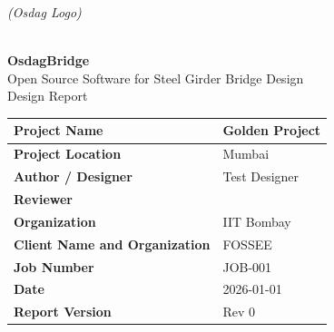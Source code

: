 
\begin{titlepage}
\thispagestyle{firstpage}
\centering
\vspace*{1.5cm}
\noindent
\begin{minipage}[c]{0.6\textwidth}
\raggedright
\textit{(Osdag Logo)}
\end{minipage}%
\hfill
\begin{minipage}[c]{0.35\textwidth}
\raggedleft

\end{minipage}
\\[1cm]

{\Huge \textbf{OsdagBridge}}\\[0.3cm]
{\large Open Source Software for Steel Girder Bridge Design}\\[1.5cm]
{\Large Design Report}\\[1.5cm]
\begin{tabular}{|L{4cm}|L{10cm}|}
\hline
\textbf{Project Name} & Golden Project \\
\hline
\textbf{Project Location} & Mumbai \\
\hline
\textbf{Author / Designer} & Test Designer \\
\hline
\textbf{Reviewer} &  \\
\hline
\textbf{Organization} & IIT Bombay \\
\hline
\textbf{Client Name and Organization} & FOSSEE \\
\hline
\textbf{Job Number} & JOB-001 \\
\hline
\textbf{Date} & 2026-01-01 \\
\hline
\textbf{Report Version} & Rev 0 \\
\hline
\end{tabular}
\end{titlepage}
